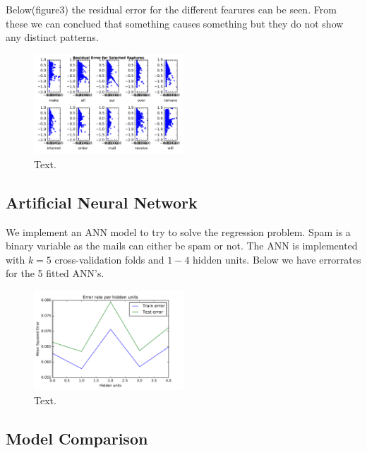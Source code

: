 \documentclass[10pt, paper=a4]{article}
\begin{document}
Below(figure3) the residual error for the different fearures can
be seen. From these we can conclued that something causes something
but they do not show any distinct patterns.

\begin{figure}[h]
  \centering
  \includegraphics[width = 0.5\textwidth]{../../src/img/residual_error.pdf}
  \caption{Text.}
  \label{fig:gam}
\end{figure}
\subsection{Artificial Neural Network}
We implement an ANN model to try to solve the regression problem. Spam
is a binary variable as the mails can either be spam or not. The ANN
is implemented with $k=5$ cross-validation folds and $1-4$ hidden
units. Below we have errorrates for the 5 fitted ANN's.

\begin{figure}[h]
  \centering
  \includegraphics[width = 0.5\textwidth]{../../src/img/ann_regression_hid_units.pdf}
  \caption{Text.}
  \label{fig:gam}
\end{figure}

\subsection{Model Comparison}
\end{document}

